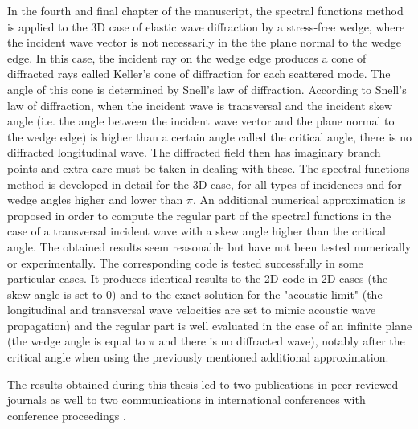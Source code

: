 In the fourth and final chapter of the manuscript, the spectral functions method is applied to the 3D case of elastic wave diffraction by a stress-free wedge, where the incident wave vector is not necessarily in the the plane normal to the wedge edge. In this case, the incident ray on the wedge edge produces a cone of diffracted rays called Keller's cone of diffraction for each scattered mode. The angle of this cone is determined by Snell's law of diffraction. According to Snell's law of diffraction, when the incident wave is transversal and the incident skew angle (i.e. the angle between the incident wave vector and the plane normal to the wedge edge) is higher than a certain angle called the critical angle, there is no diffracted longitudinal wave. The diffracted field then has imaginary branch points and extra care must be taken in dealing with these. The spectral functions method is developed in detail for the 3D case, for all types of incidences and for wedge angles higher and lower than $\pi$. An additional numerical approximation is proposed in order to compute the regular part of the spectral functions in the case of a transversal incident wave with a skew angle higher than the critical angle. The obtained results seem reasonable but have not been tested numerically or experimentally. The corresponding code is tested successfully in some particular cases. It produces identical results to the 2D code in 2D cases (the skew angle is set to $0$) and to the exact solution for the "acoustic limit" (the longitudinal and transversal wave velocities are set to mimic acoustic wave propagation) and the regular part is well evaluated in the case of an infinite plane (the wedge angle is equal to $\pi$ and there is no diffracted wave), notably after the critical angle when using the previously mentioned additional approximation.

The results obtained during this thesis led to two publications in peer-reviewed journals \cite{article, articleelasto, articleITD} as well to two communications in international conferences with conference proceedings \cite{DD2018,AFPAC}.

